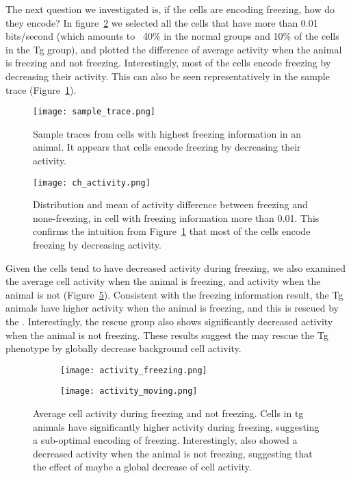 The next question we investigated is, if the cells are encoding freezing, how do they encode? In figure~\ref{f.ad.ch_activity} we selected all the cells that have more than 0.01 bits/second (which amounts to ~40\% in the normal groups and 10\% of the cells in the Tg group), and plotted the difference of average activity when the animal is freezing and not freezing. Interestingly, most of the cells encode freezing by decreasing their activity. This can also be seen representatively in the sample trace (Figure~\ref{f.ad.sample_trace}).
\begin{figure}[h]
    \texttt{[image: sample\_trace.png]}
    \caption{Sample traces from cells with highest freezing information in an animal. It appears that cells encode freezing by decreasing their activity. \label{f.ad.sample_trace}}
\end{figure}
\begin{figure}[h]
    \texttt{[image: ch\_activity.png]}
    \caption{Distribution and mean of activity difference between freezing and none-freezing, in cell with freezing information more than 0.01. This confirms the intuition from Figure~\ref{f.ad.sample_trace} that most of the cells encode freezing by decreasing activity. \label{f.ad.ch_activity}}
\end{figure}

Given the cells tend to have decreased activity during freezing, we also examined the average cell activity when the animal is freezing, and activity when the animal is not (Figure~\ref{f.ad.activity_freezing}). Consistent with the freezing information result, the Tg animals have higher activity when the animal is freezing, and this is rescued by the \tglu. Interestingly, the rescue group also shows significantly decreased activity when the animal is not freezing. These results suggest the \tglu{} may rescue the Tg phenotype by globally decrease background cell activity.
\begin{figure}[h]
    \begin{subfigure}[h]{\textwidth}
        \texttt{[image: activity\_freezing.png]}
        \caption{\label{f.ad.actf}}
    \end{subfigure}
    \begin{subfigure}[h]{\textwidth}
        \texttt{[image: activity\_moving.png]}
        \caption{\label{f.ad.actnf}}
    \end{subfigure}
    \caption{Average cell activity during  freezing and  not freezing. Cells in \gls{tg} animals have significantly higher activity during freezing, suggesting a sub-optimal encoding of freezing. Interestingly, \tglu also showed a decreased activity when the animal is not freezing, suggesting that the effect of \tglu maybe a global decrease of cell activity. \label{f.ad.activity_freezing}}
\end{figure}



